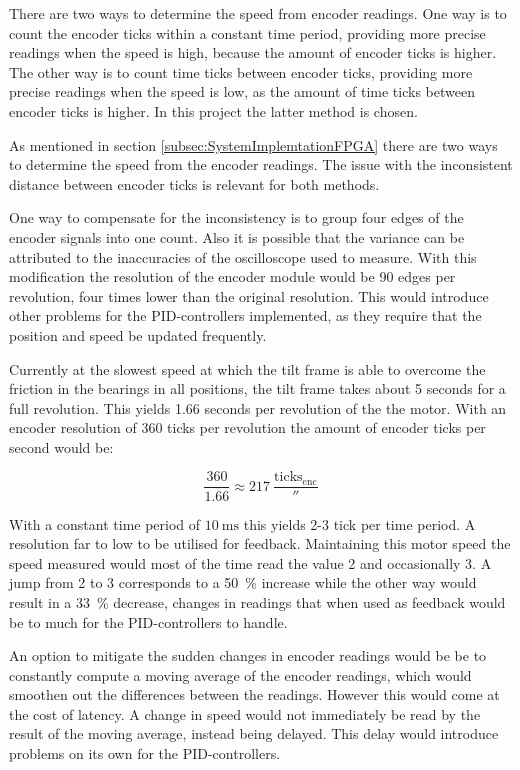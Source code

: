 \documentclass[../../main.tex]{subfiles}
\begin{document}
There are two ways to determine the speed from encoder readings. One way is to count the encoder ticks within a constant time period, providing more precise readings when the speed is high, because the amount of encoder ticks is higher. The other way is to count time ticks between encoder ticks, providing more precise readings when the speed is low, as the amount of time ticks between encoder ticks is higher. In this project the latter method is chosen.    

As mentioned in section \ref{subsec:SystemImplemtationFPGA} there are two ways to determine the speed from the encoder readings. The issue with the inconsistent distance between encoder ticks is relevant for both methods. 

One way to compensate for the inconsistency is to group four edges of the encoder signals into one count. Also it is possible that the variance can be attributed to the inaccuracies of the oscilloscope used to measure. With this modification the resolution of the encoder module would be 90 edges per revolution, four times lower than the original resolution. This would introduce other problems for the PID-controllers implemented, as they require that the position and speed be updated frequently. 

Currently at the slowest speed at which the tilt frame is able to overcome the friction in the bearings in all positions, the tilt frame takes about 5 seconds for a full revolution. This yields 1.66 seconds per revolution of the the motor. With an encoder resolution of 360 ticks per revolution the amount of encoder ticks per second would be: 

\begin{equation}
    \frac{360}{1.66} \approx \SI{ 217 }{ \frac{ \mathrm{ ticks_{enc} } }{ \second } }
\end{equation}

With a constant time period of $\SI{ 10 }{ \milli \second } $ this yields 2-3 tick per time period. A resolution far to low to be utilised for feedback. Maintaining this motor speed the speed measured would most of the time read the value 2 and occasionally 3. A jump from 2 to 3 corresponds to a \SI{50}{\percent} increase while the other way would result in a \SI{33}{\percent} decrease, changes in readings that when used as feedback would be to much for the PID-controllers to handle.

An option to mitigate the sudden changes in encoder readings would be be to constantly compute a moving average of the encoder readings, which would smoothen out the differences between the readings. However this would come at the cost of latency. A change in speed would not immediately be read by the result of the moving average, instead being delayed. This delay would introduce problems on its own for the PID-controllers. 
\end{document}
